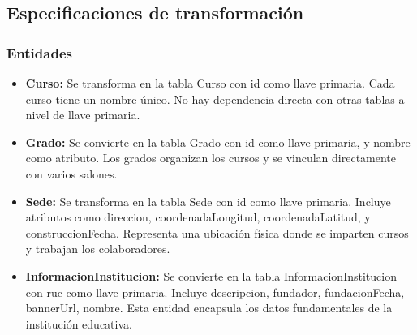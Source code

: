 \begin{itemize}
	\modeloRelacionalItem{\textcolor{darkGreen}{Grado}}{\underline{\textcolor{blue}{id}}, \textcolor{blue}{nombre}}
	\modeloRelacionalItem{\textcolor{darkGreen}{Curso}}{\underline{\textcolor{blue}{id}}, \textcolor{blue}{nombre}}
\end{itemize}
\subsection{Especificaciones de transformación}
\subsubsection{Entidades}
\begin{itemize}
	\item \textbf{Curso:} Se transforma en la tabla Curso con id como llave primaria. Cada curso tiene un nombre único. No hay dependencia directa con otras tablas a nivel de llave primaria.
	\item \textbf{Grado:} Se convierte en la tabla Grado con id como llave primaria, y nombre como atributo. Los grados organizan los cursos y se vinculan directamente con varios salones.
	\item \textbf{Sede:} Se transforma en la tabla Sede con id como llave primaria. Incluye atributos como direccion, coordenadaLongitud, coordenadaLatitud, y construccionFecha. Representa una ubicación física donde se imparten cursos y trabajan los colaboradores.
	\item \textbf{InformacionInstitucion:} Se convierte en la tabla InformacionInstitucion con ruc como llave primaria. Incluye descripcion, fundador, fundacionFecha, bannerUrl, nombre. Esta entidad encapsula los datos fundamentales de la institución educativa.
\end{itemize}
